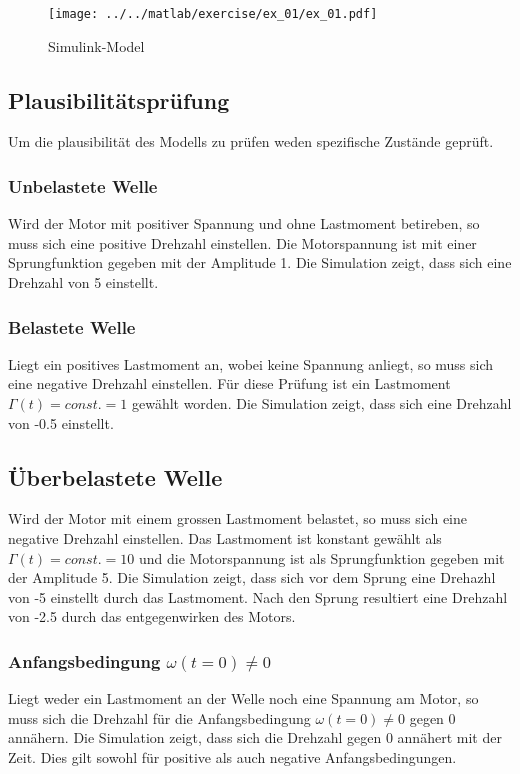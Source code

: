 

\begin{figure}[h!]
	\centering
	\texttt{[image: ../../matlab/exercise/ex\_01/ex\_01.pdf]}
	\caption{Simulink-Model}
\end{figure}

\subsection{Plausibilitätsprüfung}
Um die plausibilität des Modells zu prüfen weden spezifische Zustände geprüft.

\subsubsection{Unbelastete Welle}
Wird der Motor mit positiver Spannung und ohne Lastmoment betireben, so muss
sich eine positive Drehzahl einstellen. Die Motorspannung ist mit einer
Sprungfunktion gegeben mit der Amplitude 1. Die Simulation zeigt, dass sich
eine Drehzahl von 5 einstellt.

\subsubsection{Belastete Welle}
Liegt ein positives Lastmoment an, wobei keine Spannung anliegt, so muss sich
eine negative Drehzahl einstellen. Für diese Prüfung ist ein Lastmoment
$\Gamma(t) = const. = 1$ gewählt worden. Die Simulation zeigt, dass sich eine
Drehzahl von -0.5 einstellt.

\subsection{Überbelastete Welle}
Wird der Motor mit einem grossen Lastmoment belastet, so muss sich eine
negative Drehzahl einstellen. Das Lastmoment ist konstant gewählt als
$\Gamma(t) = const. = 10$ und die Motorspannung ist als Sprungfunktion
gegeben mit der Amplitude 5. Die Simulation zeigt, dass sich vor dem Sprung
eine Drehazhl von -5 einstellt durch das Lastmoment. Nach den Sprung
resultiert eine Drehzahl von -2.5 durch das entgegenwirken des Motors.

\subsubsection{Anfangsbedingung $\omega(t=0) \neq 0$}
Liegt weder ein Lastmoment an der Welle noch eine Spannung am Motor, so muss
sich die Drehzahl für die Anfangsbedingung $\omega(t=0) \neq 0$ gegen 0
annähern. Die Simulation zeigt, dass sich die Drehzahl gegen 0 annähert mit
der Zeit. Dies gilt sowohl für positive als auch negative Anfangsbedingungen.


